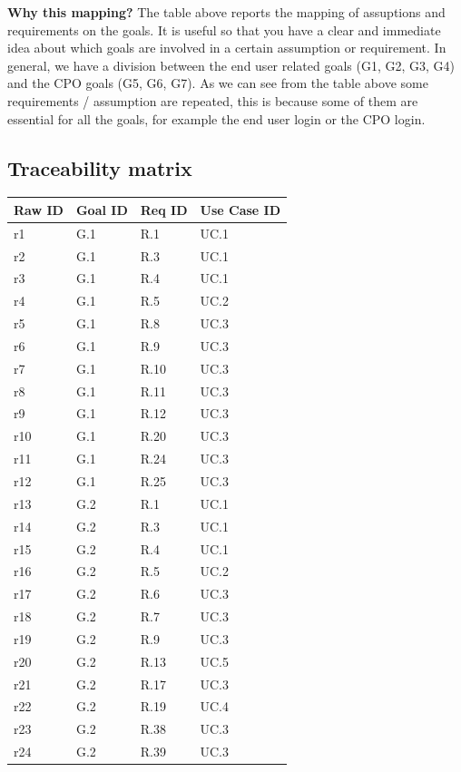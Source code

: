 \textbf{Why this mapping?} The table above reports the mapping of assuptions and requirements on the goals. It is useful so that you have a clear and immediate idea about which goals are involved in a certain assumption or requirement. In general, we have a division between the end user related goals (G1, G2, G3, G4) and the CPO goals (G5, G6, G7). As we can see from the table above some requirements / assumption are repeated, this is because some of them are essential for all the goals, for example the end user login or the CPO login.
\subsection{Traceability matrix}
\begin{longtable}{|l|l|l|l|}
\hline
\rowcolor[HTML]{B8C8D5} 
Raw ID & Goal ID & Req ID & Use Case ID \\ \hline
\endfirsthead
%
\endhead
%
r1     & G.1     & R.1    &       UC.1      \\ \hline
r2     & G.1     & R.3    &       UC.1      \\ \hline
r3     & G.1     & R.4    &       UC.1    \\ \hline
r4    & G.1     & R.5    &       UC.2    \\ \hline
r5     & G.1     & R.8    &       UC.3    \\ \hline
r6     & G.1     & R.9    &       UC.3    \\ \hline
r7     & G.1     & R.10   &         UC.3    \\ \hline
r8     & G.1     & R.11   &         UC.3    \\ \hline
r9     & G.1     & R.12   &         UC.3    \\ \hline
r10     & G.1     & R.20   &         UC.3    \\ \hline
r11    & G.1     & R.24   &         UC.3    \\ \hline
r12    & G.1     & R.25   &         UC.3    \\ \hline

r13    & G.2     & R.1    &         UC.1    \\ \hline
r14    & G.2     & R.3    &         UC.1    \\ \hline
r15    & G.2     & R.4    &         UC.1    \\ \hline
r16    & G.2     & R.5    &         UC.2    \\ \hline
r17    & G.2     & R.6    &         UC.3    \\ \hline
r18    & G.2     & R.7    &         UC.3    \\ \hline
r19    & G.2     & R.9    &         UC.3    \\ \hline
r20    & G.2     & R.13   &         UC.5    \\ \hline
r21    & G.2     & R.17   &         UC.3    \\ \hline
r22    & G.2     & R.19   &         UC.4    \\ \hline
r23    & G.2     & R.38   &         UC.3    \\ \hline
r24    & G.2     & R.39   &         UC.3    \\ \hline


\end{longtable}
